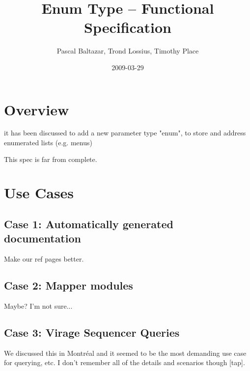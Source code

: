 \documentclass[]{article}
\title{Enum Type -- Functional Specification}
\author{ Pascal Baltazar, Trond Lossius, Timothy Place }
\date{2009-03-29}
\begin{document}
\ifpdf
{}
\else
{}
\fi

\maketitle


\begin{abstract}
\end{abstract}





\section{Overview}

it has been discussed to add a new parameter type "enum", to store and address enumerated lists (e.g. menus)

This spec is far from complete.



\section{Use Cases}

\subsection{Case 1: Automatically generated documentation}

Make our ref pages better.


\subsection{Case 2: Mapper modules}

Maybe?  I'm not sure...


\subsection{Case 3: Virage Sequencer Queries}

We discussed this in Montréal and it seemed to be the most demanding use case for querying, etc.  I don't remember all of the details and scenarios though [tap].
 
\end{document}
